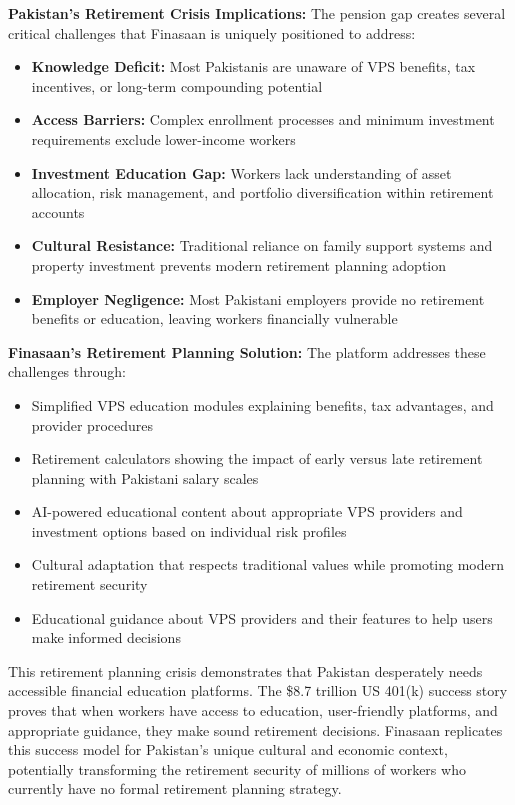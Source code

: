 \documentclass[12pt]{article}
\begin{document}
\textbf{Pakistan's Retirement Crisis Implications:} The pension gap creates several critical challenges that Finasaan is uniquely positioned to address:
\begin{itemize}
    \item \textbf{Knowledge Deficit:} Most Pakistanis are unaware of VPS benefits, tax incentives, or long-term compounding potential
    \item \textbf{Access Barriers:} Complex enrollment processes and minimum investment requirements exclude lower-income workers
    \item \textbf{Investment Education Gap:} Workers lack understanding of asset allocation, risk management, and portfolio diversification within retirement accounts
    \item \textbf{Cultural Resistance:} Traditional reliance on family support systems and property investment prevents modern retirement planning adoption
    \item \textbf{Employer Negligence:} Most Pakistani employers provide no retirement benefits or education, leaving workers financially vulnerable
\end{itemize}

\textbf{Finasaan's Retirement Planning Solution:} The platform addresses these challenges through:
\begin{itemize}
    \item Simplified VPS education modules explaining benefits, tax advantages, and provider procedures
    \item Retirement calculators showing the impact of early versus late retirement planning with Pakistani salary scales
    \item AI-powered educational content about appropriate VPS providers and investment options based on individual risk profiles
    \item Cultural adaptation that respects traditional values while promoting modern retirement security
    \item Educational guidance about VPS providers and their features to help users make informed decisions
\end{itemize}

This retirement planning crisis demonstrates that Pakistan desperately needs accessible financial education platforms. The \$8.7 trillion US 401(k) success story proves that when workers have access to education, user-friendly platforms, and appropriate guidance, they make sound retirement decisions. Finasaan replicates this success model for Pakistan's unique cultural and economic context, potentially transforming the retirement security of millions of workers who currently have no formal retirement planning strategy.
\end{document}
